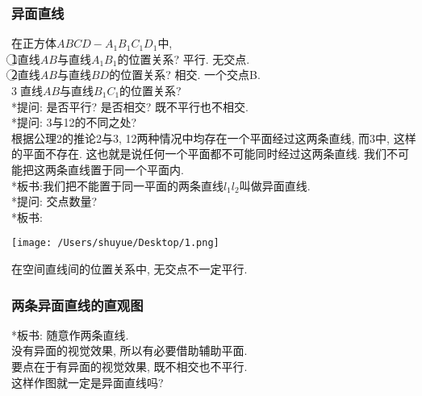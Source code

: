 \documentclass{article}
\begin{document}
\begin{CJK}{UTF8}{gkai}
\subsubsection{异面直线}
在正方体$ABCD-A_1B_1C_1D_1$中, \\
\textcircled{1}直线$AB$与直线$A_1B_1$的位置关系? 平行. 无交点.\\
\textcircled{2}直线$AB$与直线$BD$的位置关系? 相交. 一个交点B.\\
\textcircled{3}直线$AB$与直线$B_1C_1$的位置关系?\\
*提问: 是否平行? 是否相交? 既不平行也不相交.\\
*提问: 3与12的不同之处? \\
根据公理2的推论2与3, 12两种情况中均存在一个平面经过这两条直线, 而3中, 这样的平面不存在. 这也就是说任何一个平面都不可能同时经过这两条直线. 我们不可能把这两条直线置于同一个平面内.\\
*板书:我们把不能置于同一平面的两条直线$l_1 l_2$叫做异面直线.\\
*提问: 交点数量? \\
*板书: \\
\begin{center}
\texttt{[image: /Users/shuyue/Desktop/1.png]}
\end{center}
在空间直线间的位置关系中, 无交点不一定平行.\\

\subsubsection{两条异面直线的直观图}
*板书: 随意作两条直线.\\
没有异面的视觉效果, 所以有必要借助辅助平面.\\
要点在于有异面的视觉效果, 既不相交也不平行.\\
这样作图就一定是异面直线吗?\\


\end{CJK}
\end{document}
